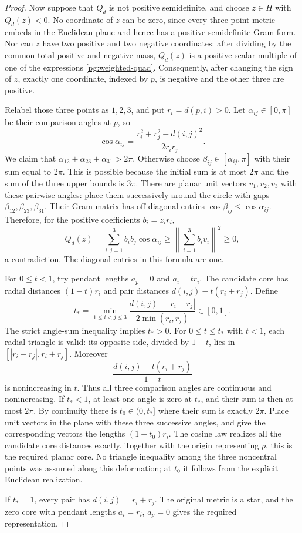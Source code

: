 \begin{proof}
Now suppose that $Q_d$ is not positive semidefinite, and choose $z\in H$
with $Q_d(z)<0$. No coordinate of $z$ can be zero, since every
three-point metric embeds in the Euclidean plane and hence has a
positive semidefinite Gram form. Nor can $z$ have two positive and two
negative coordinates: after dividing by the common total positive
and negative mass, $Q_d(z)$ is a positive scalar multiple of one
of the expressions \eqref{pg:weighted-quad}. Consequently, after
changing the sign of $z$, exactly one coordinate, indexed by $p$,
is negative and the other three are positive.

Relabel those three points as $1,2,3$, and put $r_i=d(p,i)>0$.
Let $\alpha_{ij}\in[0,\pi]$ be their comparison angles at $p$, so
\[
 \cos\alpha_{ij}
 =\frac{r_i^2+r_j^2-d(i,j)^2}{2r_i r_j}.
\]
We claim that
$\alpha_{12}+\alpha_{23}+\alpha_{31}>2\pi$.
Otherwise choose $\beta_{ij}\in[\alpha_{ij},\pi]$ with their sum
equal to $2\pi$. This is possible because the initial sum is at most
$2\pi$ and the sum of the three upper bounds is $3\pi$.
There are planar unit vectors $v_1,v_2,v_3$ with these pairwise angles:
place them successively around the circle with gaps
$\beta_{12},\beta_{23},\beta_{31}$. Their Gram matrix has off-diagonal
entries $\cos\beta_{ij}\leq\cos\alpha_{ij}$. Therefore, for the
positive coefficients $b_i=z_i r_i$,
\[
 Q_d(z)=\sum_{i,j=1}^3 b_i b_j\cos\alpha_{ij}
 \geq\left\|\sum_{i=1}^3 b_i v_i\right\|^2\geq0,
\]
a contradiction. The diagonal entries in this formula are one.

For $0\leq t<1$, try pendant lengths $a_p=0$ and $a_i=t r_i$.
The candidate core has radial distances $(1-t)r_i$ and pair distances
$d(i,j)-t(r_i+r_j)$. Define
\[
 t_* =\min_{1\leq i<j\leq3}
       \frac{d(i,j)-|r_i-r_j|}{2\min(r_i,r_j)}\in[0,1].
\]
The strict angle-sum inequality implies $t_*>0$.
For $0\leq t\leq t_*$ with $t<1$, each radial triangle is valid:
its opposite side, divided by $1-t$, lies in
$[|r_i-r_j|,r_i+r_j]$. Moreover
\[
 \frac{d(i,j)-t(r_i+r_j)}{1-t}
\]
is nonincreasing in $t$. Thus all three comparison angles are
continuous and nonincreasing. If $t_*<1$, at least one angle is zero
at $t_*$, and their sum is then at most $2\pi$. By continuity there
is $t_0\in(0,t_*]$ where their sum is exactly $2\pi$.
Place unit vectors in the plane with these three successive angles,
and give the corresponding vectors the lengths $(1-t_0)r_i$.
The cosine law realizes all the candidate core distances exactly.
Together with the origin representing $p$, this is the required
planar core. No triangle inequality among the three noncentral
points was assumed along this deformation; at $t_0$ it follows from
the explicit Euclidean realization.

If $t_*=1$, every pair has $d(i,j)=r_i+r_j$. The original metric
is a star, and the zero core with pendant lengths $a_i=r_i$, $a_p=0$
gives the required representation.
\end{proof}

